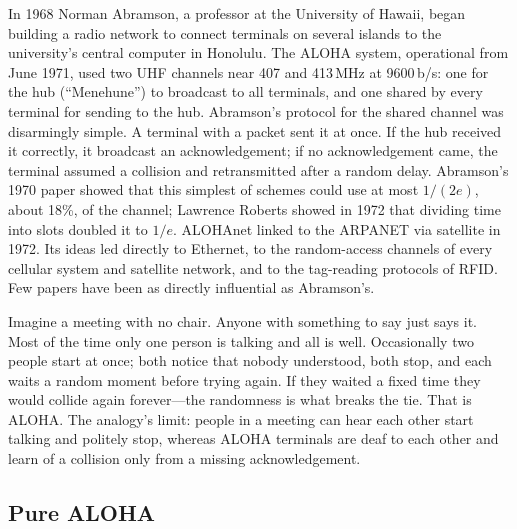 \begin{history}
In 1968 Norman Abramson, a professor at the University of Hawaii, began building a radio network to
connect terminals on several islands to the university's central computer in Honolulu. The ALOHA
system, operational from June 1971, used two UHF channels near 407 and 413\,MHz at 9600\,b/s: one
for the hub (``Menehune'') to broadcast to all terminals, and one shared by every terminal for
sending to the hub. Abramson's protocol for the shared channel was disarmingly simple. A terminal
with a packet sent it at once. If the hub received it correctly, it broadcast an acknowledgement; if
no acknowledgement came, the terminal assumed a collision and retransmitted after a random delay.
Abramson's 1970 paper showed that this simplest of schemes could use at most $1/(2e)$, about 18\%, of
the channel; Lawrence Roberts showed in 1972 that dividing time into slots doubled it to $1/e$.
ALOHAnet linked to the ARPANET via satellite in 1972. Its ideas led directly to Ethernet, to the
random-access channels of every cellular system and satellite network, and to the tag-reading
protocols of RFID. Few papers have been as directly influential as Abramson's.
\end{history}

\begin{analogy}
Imagine a meeting with no chair. Anyone with something to say just says it. Most of the time only one
person is talking and all is well. Occasionally two people start at once; both notice that nobody
understood, both stop, and each waits a random moment before trying again. If they waited a fixed
time they would collide again forever---the randomness is what breaks the tie. That is ALOHA. The
analogy's limit: people in a meeting can hear each other start talking and politely stop, whereas
ALOHA terminals are deaf to each other and learn of a collision only from a missing acknowledgement.
\end{analogy}


\subsection{Pure ALOHA}

